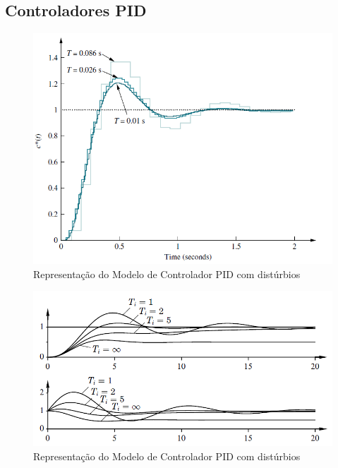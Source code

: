 \subsection{Controladores PID}

\begin{figure}[htb]
  \caption{Representação do Modelo de Controlador PID com distúrbios}
  \begin{center}
      \includegraphics[scale=0.65]{img/nise_digitalinput_p761}
  \end{center}
\end{figure}

\begin{figure}[htb]
  \caption{Representação do Modelo de Controlador PID com distúrbios}
  \begin{center}
      \includegraphics[scale=0.75]{img/pi_astrom_p68}
  \end{center}
\end{figure}

